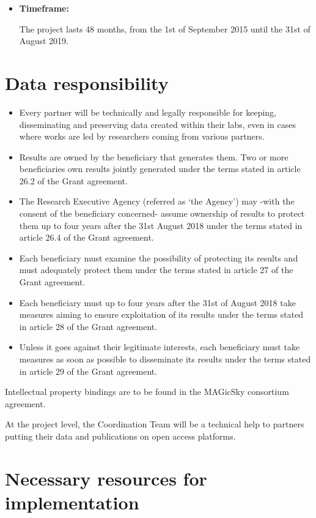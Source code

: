 \documentclass[12pt]{article}
\begin{document}
\begin{itemize} 
\item\textbf{Timeframe:}

The project lasts 48 months, from the 1st of September 2015 until the 31st of August 2019.
\end{itemize}

\section{Data responsibility}

\begin{itemize}
\item{}Every partner will be technically and legally responsible for keeping, disseminating and preserving data created within their labs, even in cases where works are led by researchers coming from various partners.
\item{}Results are owned by the beneficiary that generates them. Two or more beneficiaries own results jointly generated under the terms stated in article 26.2 of the Grant agreement.
\item{}The Research Executive Agency (referred as ‘the Agency’) may -with the consent of the beneficiary concerned- assume ownership of results to protect them up to four years after the 31st August 2018 under the terms stated in article 26.4 of the Grant agreement.
\item{}Each beneficiary must examine the possibility of protecting its results and must adequately protect them under the terms stated in article 27 of the Grant agreement.
\item{}Each beneficiary must up to four years after the 31st of August 2018 take measures aiming to ensure exploitation of its results under the terms stated in article 28 of the Grant agreement.
\item{}Unless it goes against their legitimate interests, each beneficiary must take measures as soon as possible to disseminate its results under the terms stated in article 29 of the Grant agreement.
\end{itemize}

Intellectual property bindings are to be found in the MAGicSky consortium agreement.

At the project level, the Coordination Team will be a technical help to partners putting their data and publications on open access platforms.

\section{Necessary resources for implementation}
\end{document}
